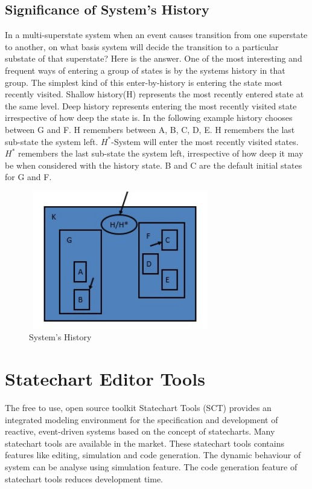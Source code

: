 \documentclass[a4paper,12pt,oneside]{article}
\begin{document}
\subsection{Significance of System's History}
In a multi-superstate system when an event causes transition from one superstate to another, on what basis system will decide the transition to a particular substate of that superstate? Here is the answer. One of the most interesting  and frequent  ways of entering  a group of states is by the system\textquotesingle s history in that group. The simplest  kind of this enter-by-history  is entering  the state most recently  visited. Shallow history(H) represents the most recently entered state at the same level. Deep history represents entering the most recently visited state irrespective of how deep the state is. In the following example history chooses between G and F. H remembers between A, B, C, D, E. H remembers the last sub-state the system left. $H^*$-System will enter the most recently visited states. $H^*$ remembers the last sub-state the system left, irrespective of how deep it may be when considered with the history state. B and C are the default initial states for G and F.
\begin{figure}[H]
\centering
\includegraphics[width=8cm,height=6cm]{Screenshot003.jpg}
\caption{System's History}
\end{figure}
\section{Statechart Editor Tools}
The free to use, open source toolkit Statechart Tools (SCT) provides an integrated modeling environment for the specification and development of reactive, event-driven systems based on the concept of statecharts. Many statechart tools are available in the market. These statechart tools contains features like editing, simulation and code generation. The dynamic behaviour of system can be analyse using simulation feature. The code generation feature of statechart tools reduces development time.
\end{document}
